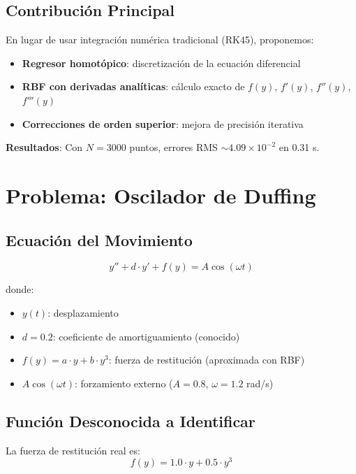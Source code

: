 \documentclass[11pt,a4paper]{article}
\begin{document}
\subsection{Contribución Principal}

En lugar de usar integración numérica tradicional (RK45), proponemos:
\begin{itemize}
\item \textbf{Regresor homotópico}: discretización de la ecuación diferencial
\item \textbf{RBF con derivadas analíticas}: cálculo exacto de $f(y)$, $f'(y)$, $f''(y)$, $f'''(y)$
\item \textbf{Correcciones de orden superior}: mejora de precisión iterativa
\end{itemize}

\textbf{Resultados}: Con $N=3000$ puntos, errores RMS $\sim 4.09 \times 10^{-2}$ en 0.31 s.

\section{Problema: Oscilador de Duffing}

\subsection{Ecuación del Movimiento}

\begin{equation}
y'' + d \cdot y' + f(y) = A \cos(\omega t)
\end{equation}

donde:
\begin{itemize}
\item $y(t)$: desplazamiento
\item $d = 0.2$: coeficiente de amortiguamiento (conocido)
\item $f(y) = a \cdot y + b \cdot y^3$: fuerza de restitución (aproximada con RBF)
\item $A \cos(\omega t)$: forzamiento externo ($A = 0.8$, $\omega = 1.2$ rad/s)
\end{itemize}

\subsection{Función Desconocida a Identificar}

La fuerza de restitución real es:
\begin{equation}
f(y) = 1.0 \cdot y + 0.5 \cdot y^3
\end{equation}
\end{document}
